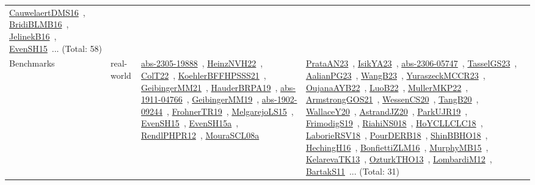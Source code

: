 {\begin{longtable}{lp{3cm}>{\raggedright\arraybackslash}p{6cm}>{\raggedright\arraybackslash}p{6cm}>{\raggedright\arraybackslash}p{8cm}}
\href{papers/CauwelaertDMS16.pdf}{CauwelaertDMS16}~\cite{CauwelaertDMS16}, \href{articles/BridiBLMB16.pdf}{BridiBLMB16}~\cite{BridiBLMB16}, \href{papers/JelinekB16.pdf}{JelinekB16}~\cite{JelinekB16}, \href{papers/EvenSH15.pdf}{EvenSH15}~\cite{EvenSH15}... (Total: 58)\\
Benchmarks & real-world & \href{articles/abs-2305-19888.pdf}{abs-2305-19888}~\cite{abs-2305-19888}, \href{articles/HeinzNVH22.pdf}{HeinzNVH22}~\cite{HeinzNVH22}, \href{articles/ColT22.pdf}{ColT22}~\cite{ColT22}, \href{articles/KoehlerBFFHPSSS21.pdf}{KoehlerBFFHPSSS21}~\cite{KoehlerBFFHPSSS21}, \href{papers/GeibingerMM21.pdf}{GeibingerMM21}~\cite{GeibingerMM21}, \href{articles/HauderBRPA19.pdf}{HauderBRPA19}~\cite{HauderBRPA19}, \href{articles/abs-1911-04766.pdf}{abs-1911-04766}~\cite{abs-1911-04766}, \href{papers/GeibingerMM19.pdf}{GeibingerMM19}~\cite{GeibingerMM19}, \href{articles/abs-1902-09244.pdf}{abs-1902-09244}~\cite{abs-1902-09244}, \href{papers/FrohnerTR19.pdf}{FrohnerTR19}~\cite{FrohnerTR19}, \href{papers/MelgarejoLS15.pdf}{MelgarejoLS15}~\cite{MelgarejoLS15}, \href{papers/EvenSH15.pdf}{EvenSH15}~\cite{EvenSH15}, \href{articles/EvenSH15a.pdf}{EvenSH15a}~\cite{EvenSH15a}, \href{papers/RendlPHPR12.pdf}{RendlPHPR12}~\cite{RendlPHPR12}, \href{papers/MouraSCL08a.pdf}{MouraSCL08a}~\cite{MouraSCL08a} & \href{articles/PrataAN23.pdf}{PrataAN23}~\cite{PrataAN23}, \href{articles/IsikYA23.pdf}{IsikYA23}~\cite{IsikYA23}, \href{articles/abs-2306-05747.pdf}{abs-2306-05747}~\cite{abs-2306-05747}, \href{papers/TasselGS23.pdf}{TasselGS23}~\cite{TasselGS23}, \href{papers/AalianPG23.pdf}{AalianPG23}~\cite{AalianPG23}, \href{papers/WangB23.pdf}{WangB23}~\cite{WangB23}, \href{articles/YuraszeckMCCR23.pdf}{YuraszeckMCCR23}~\cite{YuraszeckMCCR23}, \href{papers/OujanaAYB22.pdf}{OujanaAYB22}~\cite{OujanaAYB22}, \href{papers/LuoB22.pdf}{LuoB22}~\cite{LuoB22}, \href{articles/MullerMKP22.pdf}{MullerMKP22}~\cite{MullerMKP22}, \href{papers/ArmstrongGOS21.pdf}{ArmstrongGOS21}~\cite{ArmstrongGOS21}, \href{papers/WessenCS20.pdf}{WessenCS20}~\cite{WessenCS20}, \href{papers/TangB20.pdf}{TangB20}~\cite{TangB20}, \href{articles/WallaceY20.pdf}{WallaceY20}~\cite{WallaceY20}, \href{articles/AstrandJZ20.pdf}{AstrandJZ20}~\cite{AstrandJZ20}, \href{papers/ParkUJR19.pdf}{ParkUJR19}~\cite{ParkUJR19}, \href{papers/FrimodigS19.pdf}{FrimodigS19}~\cite{FrimodigS19}, \href{papers/RiahiNS018.pdf}{RiahiNS018}~\cite{RiahiNS018}, \href{papers/HoYCLLCLC18.pdf}{HoYCLLCLC18}~\cite{HoYCLLCLC18}, \href{articles/LaborieRSV18.pdf}{LaborieRSV18}~\cite{LaborieRSV18}, \href{articles/PourDERB18.pdf}{PourDERB18}~\cite{PourDERB18}, \href{articles/ShinBBHO18.pdf}{ShinBBHO18}~\cite{ShinBBHO18}, \href{papers/HechingH16.pdf}{HechingH16}~\cite{HechingH16}, \href{papers/BonfiettiZLM16.pdf}{BonfiettiZLM16}~\cite{BonfiettiZLM16}, \href{papers/MurphyMB15.pdf}{MurphyMB15}~\cite{MurphyMB15}, \href{papers/KelarevaTK13.pdf}{KelarevaTK13}~\cite{KelarevaTK13}, \href{articles/OzturkTHO13.pdf}{OzturkTHO13}~\cite{OzturkTHO13}, \href{articles/LombardiM12.pdf}{LombardiM12}~\cite{LombardiM12}, \href{articles/BartakS11.pdf}{BartakS11}~\cite{BartakS11}... (Total: 31) & 
\end{longtable}}
